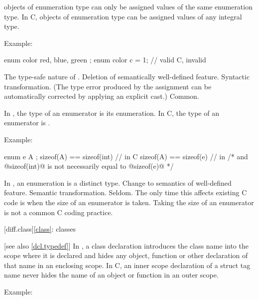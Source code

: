 \change
\Cpp{} objects of enumeration type can only be assigned values of the same enumeration type.
In C, objects of enumeration type can be assigned values of any integral type.

Example:
\begin{codeblock}
enum color { red, blue, green };
enum color c = 1;               // valid C, invalid \Cpp{}
\end{codeblock}

\rationale
The type-safe nature of \Cpp{}.
\effect
Deletion of semantically well-defined feature.
\difficulty
Syntactic transformation.
(The type error produced by the assignment can be automatically
corrected by applying an explicit cast.)
\howwide
Common.

\change
In \Cpp{}, the type of an enumerator is its enumeration. In C, the type of an enumerator is .

Example:

\begin{codeblock}
enum e { A };
sizeof(A) == sizeof(int)        // in C
sizeof(A) == sizeof(e)          // in \Cpp{}
/* and @sizeof(int)@ is not necessarily equal to @sizeof(e)@ */
\end{codeblock}

\rationale
In \Cpp{}, an enumeration is a distinct type.
\effect
Change to semantics of well-defined feature.
\difficulty
Semantic transformation.
\howwide
Seldom.
The only time this affects existing C code is when the size of an
enumerator is taken.
Taking the size of an enumerator is not a
common C coding practice.

[diff.class]{\ref{class}: classes}

 [see also \ref{dcl.typedef}]
\change
In \Cpp{}, a class declaration introduces the class name into the scope where it is
declared and hides any object, function or other declaration of that name in an enclosing
scope. In C, an inner scope declaration of a struct tag name never hides the name of an
object or function in an outer scope.

Example:

